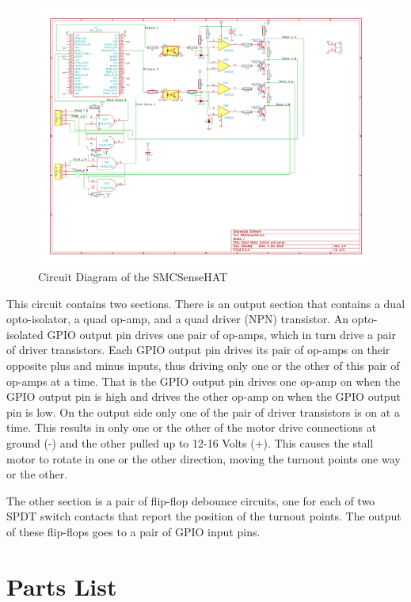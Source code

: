 \begin{figure}[hbpt]\begin{centering}%
\includegraphics[width=5in]{SMCSenseHAT.pdf}
\caption{Circuit Diagram of the SMCSenseHAT}
\end{centering}\end{figure}
This circuit contains two sections.  There is an output section that contains 
a dual opto-isolator, a quad op-amp, and a quad driver (NPN) transistor.  An 
opto-isolated GPIO output pin drives one pair of op-amps, which in turn drive 
a pair of driver transistors.  Each GPIO output pin drives its pair of op-amps 
on their opposite plus and minus inputs, thus driving only one or the other of 
this pair of op-amps at a time.  That is the GPIO output pin drives one op-amp 
on when the GPIO output pin is high and drives the other op-amp on when the 
GPIO output pin is low.  On the output side only one of the pair of driver 
transistors is on at a time.  This results in only one or the other of the 
motor drive connections at ground (-) and the other pulled up to 12-16 Volts 
(+).  This causes the stall motor to rotate in one or the other direction, 
moving the turnout points one way or the other.

The other section is a pair of flip-flop debounce circuits, one for each of 
two SPDT switch contacts that report the position of the turnout points.  The 
output of these flip-flops goes to a pair of GPIO input pins.

\section{Parts List}

